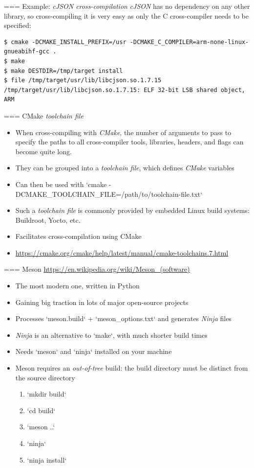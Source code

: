 === Example: {\em cJSON cross-compilation}
  {\em cJSON} has no dependency on any other library, so
  cross-compiling it is very easy as only the C cross-compiler needs
  to be specified:
  \begin{block}{}
    {\scriptsize
\begin{verbatim}
$ cmake -DCMAKE_INSTALL_PREFIX=/usr -DCMAKE_C_COMPILER=arm-none-linux-gnueabihf-gcc .
$ make
$ make DESTDIR=/tmp/target install
$ file /tmp/target/usr/lib/libcjson.so.1.7.15
/tmp/target/usr/lib/libcjson.so.1.7.15: ELF 32-bit LSB shared object, ARM
\end{verbatim}
    }
  \end{block}


=== {CMake {\em toolchain file}}
  \begin{itemize}
  \item When cross-compiling with {\em CMake}, the number of arguments
    to pass to specify the paths to all cross-compiler tools,
    libraries, headers, and flags can become quite long.
  \item They can be grouped into a {\em toolchain file}, which defines
    {\em CMake} variables
  \item Can then be used with `cmake
      -DCMAKE_TOOLCHAIN_FILE=/path/to/toolchain-file.txt`
  \item Such a {\em toolchain file} is commonly provided by embedded
    Linux build systems: Buildroot, Yocto, etc.
  \item Facilitates cross-compilation using CMake
  \item \url{https://cmake.org/cmake/help/latest/manual/cmake-toolchains.7.html}
  \end{itemize}


=== {Meson}
  \url{https://en.wikipedia.org/wiki/Meson_(software)}
  \begin{itemize}
  \item The most modern one, written in Python
  \item Gaining big traction in lots of major open-source projects
  \item Processes `meson.build` + `meson_options.txt` and
    generates {\em Ninja} files
  \item {\em Ninja} is an alternative to `make`, with much
    shorter build times
  \item Needs `meson` and `ninja` installed on your machine
  \item Meson requires an {\em out-of-tree} build: the build directory
    must be distinct from the source directory
    \begin{enumerate}
    \item `mkdir build`
    \item `cd build`
    \item `meson ..`
    \item `ninja`
    \item `ninja install`
    \end{enumerate}
  \end{itemize}


